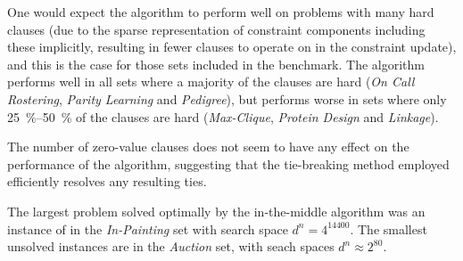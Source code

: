 One would expect the algorithm to perform well on problems with many hard clauses (due to the sparse representation of constraint components including these implicitly, resulting in fewer clauses to operate on in the constraint update), and this is the case for those sets included in the benchmark.
The algorithm performs well in all sets where a majority of the clauses are hard (\emph{On Call Rostering}, \emph{Parity Learning} and \emph{Pedigree}), but performs worse in sets where only \SIrange{25}{50}{\percent} of the clauses are hard (\emph{Max-Clique}, \emph{Protein Design} and \emph{Linkage}).

The number of zero-value clauses does not seem to have any effect on the performance of the algorithm, suggesting that the tie-breaking method employed efficiently resolves any resulting ties.

The largest problem solved optimally by the in-the-middle algorithm was an instance of in the \emph{In-Painting} set with search space \(d^n = 4^{\num{14400}}\).
The smallest unsolved instances are in the \emph{Auction} set, with seach spaces \(d^n \approx 2^{80}\).

